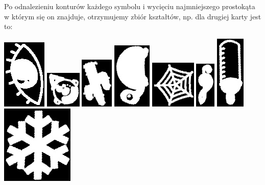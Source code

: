 \documentclass[10pt,a4paper]{article}
\begin{document}
Po odnalezieniu konturów każdego symbolu i wycięciu najmniejszego prostokąta w którym się on znajduje, otrzymujemy zbiór kształtów, np. dla drugiej karty jest to:\\
\begin{center}
\includegraphics[scale=0.5]{2.1/sign10.jpg}
\includegraphics[scale=0.5]{2.1/sign11.jpg}
\includegraphics[scale=0.5]{2.1/sign12.jpg}
\includegraphics[scale=0.5]{2.1/sign13.jpg}
\includegraphics[scale=0.5]{2.1/sign14.jpg}
\includegraphics[scale=0.5]{2.1/sign15.jpg}
\includegraphics[scale=0.5]{2.1/sign16.jpg}
\includegraphics[scale=0.5]{2.1/sign17.jpg}
\end{center}
\end{document}
